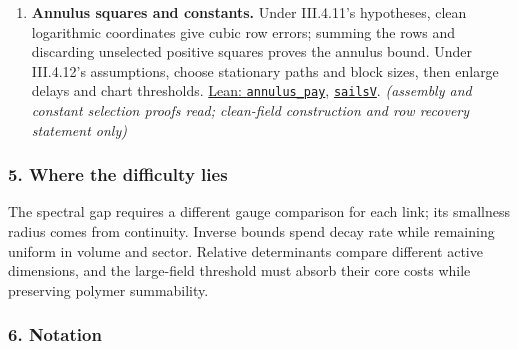 \documentclass[
  letterpaper,
  11pt]{article}
\begin{document}
\begin{enumerate}
  supplies the weighted inverse and window jet bounds.
  \href{https://github.com/yang-mills-group/OpenAI-YM-20261028/blob/3456e5e75cf8d4cd558955a5c7638fba2d68f464/YM/AnalyticBridge/SECTOR_COVARIANCE_JETS/Sounds.lean\#L69-L101}{Lean:
  \texttt{sounds}},
  \href{https://github.com/yang-mills-group/OpenAI-YM-20261028/blob/3456e5e75cf8d4cd558955a5c7638fba2d68f464/YM/AnalyticBridge/SECTOR_AFFINE_JETS/Covariance.lean\#L146-L210}{\texttt{assembly}}.
  \emph{(predictor and precision proofs read; transport and cut-error
  bounds statement only)}
\item
  \textbf{Annulus squares and constants.} Under III.4.11's hypotheses,
  clean logarithmic coordinates give cubic row errors; summing the rows
  and discarding unselected positive squares proves the annulus bound.
  Under III.4.12's assumptions, choose stationary paths and block sizes,
  then enlarge delays and chart thresholds.
  \href{https://github.com/yang-mills-group/OpenAI-YM-20261028/blob/3456e5e75cf8d4cd558955a5c7638fba2d68f464/YM/SectorNext/LARGE_FIELD_REMAINDERS/Annulus.lean\#L36-L127}{Lean:
  \texttt{annulus\_pay}},
  \href{https://github.com/yang-mills-group/OpenAI-YM-20261028/blob/3456e5e75cf8d4cd558955a5c7638fba2d68f464/YM/MergeProof/Seaside.lean\#L96-L154}{\texttt{sailsV}}.
  \emph{(assembly and constant selection proofs read; clean-field
  construction and row recovery statement only)}
\end{enumerate}

\subsubsection{5. Where the difficulty
lies}\label{where-the-difficulty-lies-6}

The spectral gap requires a different gauge comparison for each link;
its smallness radius comes from continuity. Inverse bounds spend decay
rate while remaining uniform in volume and sector. Relative determinants
compare different active dimensions, and the large-field threshold must
absorb their core costs while preserving polymer summability.

\subsubsection{6. Notation}\label{notation-6}
\end{document}
